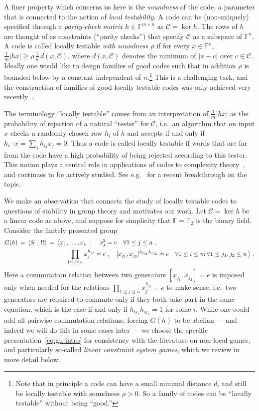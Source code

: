 \documentclass[11pt]{article}
\theoremstyle{definition}
\newcommand{\code}{\mathscr{C}}
\newcommand{\F}{\ensuremath{\mathbb{F}}}
\begin{document}
A finer property which concerns us here is the \emph{soundness} of the code, a parameter that is connected to the notion of \emph{local testability}. A code can be (non-uniquely) specified through a \emph{parity-check matrix} $h\in\F^{m\times n}$ as $\code = \ker h$. The rows of $h$ are thought of as constraints (``parity checks'') that specify $\code$ as a subspace of $\F^n$. A code is called locally testable \emph{with soundness $\rho$} if for every $x\in \F^n$, $\frac{1}{m}|hx|\geq \rho \, \frac{1}{n}\, d(x,\code)$, where $d(x,\code)$ denotes the minimum of $|x-c|$ over $c\in \code$.  Ideally one would like to design families of good codes such that in addition $\rho$ is bounded below by a constant independent of $n$.\footnote{Note that in principle a code can have a small minimal distance $d$, and still be locally testable with soundness $\rho>0$. So a family of codes can be ``locally testable'' without being ``good.''} This is a challenging task, and the construction of families of good locally testable codes was only achieved very recently~\cite{LTC_DELLM,LTC_Panteleev_Kalachev}. 

The terminology ``locally testable'' comes from an interpretation of $\frac{1}{m}|hx|$ as the probability of rejection of a natural ``tester'' for $\code$, i.e.\ an algorithm that on input $x$ checks a randomly chosen row $h_i$ of $h$ and accepts if and only if $h_i\cdot x = \sum_j h_{ij} x_j =0$.  Thus a code is called locally testable if words that are far from the code have a high probability of being rejected according to this tester. This notion plays a central role in applications of codes to complexity theory~\cite{babai1991non,PCP_thm}, and continues to be actively studied. See e.g.~\cite{LTC_DELLM,LTC_Panteleev_Kalachev} for a recent breakthrough on the topic. 

We make an observation that connects the study of locally testable codes to questions of stability in group theory and motivates our work. Let $\code=\ker h$ be a linear code as above, and suppose for simplicity that $\F=\F_2$ is the binary field. Consider the finitely presented group 
\begin{align}
 G(h) \,=\, \langle S:R\rangle \,=\, \big\langle &x_1,\ldots,x_n \,:\quad  x_j^2=e\quad \forall 1\leq j\leq n\;,\notag\\
& \quad \prod_{1\leq j \leq n} x_j^{h_{ij}} = e\;,\quad [x_{j_1},x_{j_2}]^{h_{ij_1} h_{ij_2}}=e\quad \forall 1\leq i\leq m\,\forall 1\leq j_1,j_2\leq n\,\big\rangle\;.\label{eq:gh-intro}
\end{align}
Here a commutation relation between two generators  $[x_{j_1},x_{j_2}]=e$ is imposed only when needed for the relations $\prod_{1\leq j \leq n} x_j^{h_{ij}} = e$ to make sense, i.e.\ two generators are required to commute only if they both take part in the same equation, which is the case if and only if $h_{ij_1}h_{ij_2}=1$ for some $i$. While one could add all pairwise commutation relations, forcing $G(h)$ to be abelian --- and indeed we will do this in some cases later --- we choose the specific presentation~\eqref{eq:gh-intro} for consistency with the literature on non-local games, and particularly so-called \emph{linear constraint system games}, which we review in more detail below. 
\end{document}
